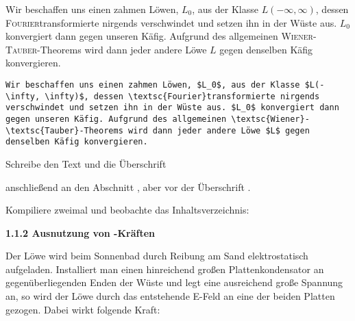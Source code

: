 \documentclass["WS\space 16-17\space -\space LaTeX-Kurs\space -\space Praesentation\space -\space 1.tex"]{subfiles}
\begin{document}
\begin{frame}[fragile]
	\Losung
	\begin{outputbox}
		Wir beschaffen uns einen zahmen Löwen, $L_0$, aus der Klasse $L(- \infty, \infty)$, dessen \textsc{Fourier}transformierte nirgends verschwindet und setzen ihn in der Wüste aus. $L_0$ konvergiert dann gegen unseren Käfig. Aufgrund des allgemeinen \textsc{Wiener-Tauber}-Theorems wird dann jeder andere Löwe $L$ gegen denselben Käfig konvergieren.
	\end{outputbox}

	\Code
	\begin{lstlisting}[gobble=8]
	    Wir beschaffen uns einen zahmen Löwen, $L_0$, aus der Klasse $L(- \infty, \infty)$, dessen \textsc{Fourier}transformierte nirgends verschwindet und setzen ihn in der Wüste aus. $L_0$ konvergiert dann gegen unseren Käfig. Aufgrund des allgemeinen \textsc{Wiener}-\textsc{Tauber}-Theorems wird dann jeder andere Löwe $L$ gegen denselben Käfig konvergieren.
	\end{lstlisting}
\end{frame}
\begin{frame}[fragile]
	\Aufgabee
  Schreibe den Text und die Überschrift

  \textrm{}

  anschließend an den Abschnitt , aber vor der Überschrift .

  Kompiliere zweimal und beobachte das Inhaltsverzeichnis:
  
	\begin{outputbox}
		{ \large\textbf{1.1.2 Ausnutzung von -Kräften}}
		
		Der Löwe wird beim Sonnenbad durch Reibung am Sand elektrostatisch aufgeladen. Installiert man einen hinreichend großen Plattenkondensator an gegenüberliegenden Enden der Wüste und legt eine ausreichend große Spannung an, so wird der Löwe durch das entstehende E-Feld an eine der beiden Platten gezogen. Dabei wirkt folgende Kraft: 
	\end{outputbox}
\end{frame}
\end{document}
